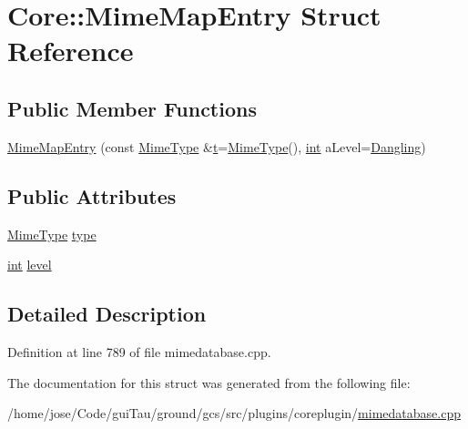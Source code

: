\hypertarget{struct_core_1_1_mime_map_entry}{\section{Core\-:\-:Mime\-Map\-Entry Struct Reference}
\label{struct_core_1_1_mime_map_entry}
}
\subsection*{Public Member Functions}
\begin{DoxyCompactItemize}
\item 
\hyperlink{group___core_plugin_ga53abe7106f23f526e73ccb4b3937bdb7}{Mime\-Map\-Entry} (const \hyperlink{class_core_1_1_mime_type}{Mime\-Type} \&\hyperlink{glext_8h_a00140d6f5c548b26daf170bf16e86a6d}{t}=\hyperlink{class_core_1_1_mime_type}{Mime\-Type}(), \hyperlink{ioapi_8h_a787fa3cf048117ba7123753c1e74fcd6}{int} a\-Level=\hyperlink{group___core_plugin_gga53f7f4dccaf625c89df1b42297204739a8312614a0b402ff5e3d6b897d3f84f18}{Dangling})
\end{DoxyCompactItemize}
\subsection*{Public Attributes}
\begin{DoxyCompactItemize}
\item 
\hyperlink{class_core_1_1_mime_type}{Mime\-Type} \hyperlink{group___core_plugin_ga4f10a09b24dd7f38aa959a72898cb6f5}{type}
\item 
\hyperlink{ioapi_8h_a787fa3cf048117ba7123753c1e74fcd6}{int} \hyperlink{group___core_plugin_gaeaf608ca7c31f9e28c621edd407ea730}{level}
\end{DoxyCompactItemize}


\subsection{Detailed Description}


Definition at line 789 of file mimedatabase.\-cpp.



The documentation for this struct was generated from the following file\-:\begin{DoxyCompactItemize}
\item 
/home/jose/\-Code/gui\-Tau/ground/gcs/src/plugins/coreplugin/\hyperlink{mimedatabase_8cpp}{mimedatabase.\-cpp}\end{DoxyCompactItemize}
